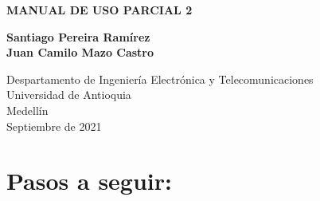 \documentclass{article}
\begin{document}
\begin{titlepage}
    \begin{center}
        \vspace*{1cm}
            
        \Huge
        \textbf{MANUAL DE USO PARCIAL 2}
            
            
        \vspace{1.5cm}
            
        \textbf{Santiago Pereira Ramírez\\
            Juan Camilo Mazo Castro}
            
        \vfill
            
        \vspace{0.8cm}
            
        \Large
        Despartamento de Ingeniería Electrónica y Telecomunicaciones\\
        Universidad de Antioquia\\
        Medellín\\
        Septiembre de 2021
            
    \end{center}
\end{titlepage}

\newpage

\section{Pasos a seguir:}\label{contenido}
  
\end{document}
